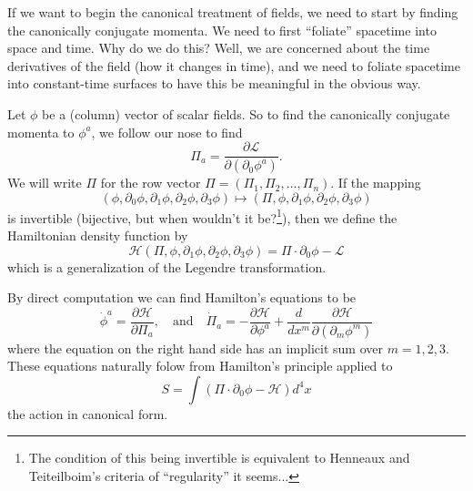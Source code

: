 
If we want to begin the canonical treatment of fields, we need to
start by finding the canonically conjugate momenta. We need to
first ``foliate'' spacetime into space and time. Why do we do
this? Well, we are concerned about the time derivatives of the
field (how it changes in time), and we need to foliate spacetime
into constant-time surfaces to have this be meaningful in the
obvious way. 

Let $\phi$ be a (column) vector of scalar fields. So
to find the canonically conjugate momenta to  $\phi^{a}$, we
follow our nose to find
\begin{equation}%
\Pi_{a} = \frac{\partial\mathcal{L}}{\partial(\partial_{0}\phi^{a})}.
\end{equation}
We will write $\Pi$ for the row vector
$\Pi=(\Pi_{1},\Pi_{2},\ldots,\Pi_{n})$. If the mapping
\begin{equation}%
(\phi,\partial_{0}\phi,\partial_{1}\phi,\partial_{2}\phi,\partial_{3}\phi)\mapsto(\Pi,\phi,\partial_{1}\phi,\partial_{2}\phi,\partial_{3}\phi)
\end{equation}
is invertible (bijective, but when wouldn't it be?\footnote{The
  condition of this being invertible is equivalent to Henneaux
  and Teiteilboim's criteria of ``regularity'' it seems...}),
then we define the Hamiltonian density  function by
\begin{equation}%
\mathcal{H}(\Pi,\phi,\partial_{1}\phi,\partial_{2}\phi,\partial_{3}\phi)
= \Pi\cdot\partial_{0}\phi-\mathcal{L}
\end{equation}
which is a generalization of the Legendre transformation.

By direct computation we can find Hamilton's equations to be
\begin{equation}%
\dot{\phi}^{a} =
\frac{\partial\mathcal{H}}{\partial\Pi_{a}},\quad\text{and}\quad\dot{\Pi}_{a}
= -\frac{\partial\mathcal{H}}{\partial\phi^{a}}+\frac{d}{dx^{m}}\frac{\partial\mathcal{H}}{\partial(\partial_{m}\phi^{m})}
\end{equation}
where the equation on the right hand side has an implicit sum
over $m=1,2,3$. These equations naturally folow from Hamilton's
principle applied to
\begin{equation}%
S = \int(\Pi\cdot\partial_{0}\phi-\mathcal{H})d^{4}x
\end{equation}
the action in canonical form.

